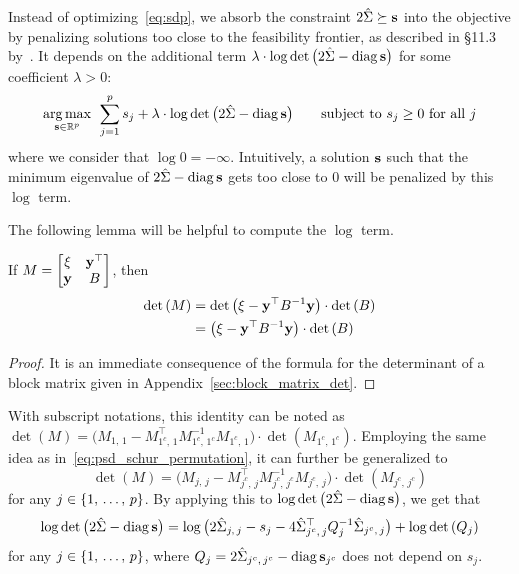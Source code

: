 Instead of optimizing~\ref{eq:sdp},
we absorb the constraint $2\hat{\Sigma} \succeq \mathbf{s}$ into the objective by penalizing solutions
too close to the feasibility frontier, as described in §11.3 by~\cite{convex_optimization}.
It depends on the additional term
$\lambda \cdot \log\det\big( 2\hat{\Sigma} - \operatorname*{diag}\mathbf{s} \big)$
for some coefficient $\lambda > 0$:
\begin{equation}\label{eq:sdp_log_barrier}
    \underset{\mathbf{s} \in \mathbb{R}^p}{\operatorname*{arg\,max}}\;\,
    \sum_{j = 1}^p s_j
    + \lambda \cdot \log\det\big( 2\hat{\Sigma} - \operatorname*{diag}\mathbf{s} \big)
    \qquad
    \text{subject to }
    s_j \geq 0\text{ for all } j
\end{equation}
where we consider that $\log 0 = -\infty$.
Intuitively, a solution $\mathbf{s}$ such that the minimum eigenvalue of $2\hat{\Sigma} - \operatorname*{diag}\mathbf{s}$ gets too close to $0$
will be penalized by this $\log$ term.

\bigbreak
The following lemma will be helpful to compute the $\log$ term.
\begin{lemma}
    If $M = \begin{bmatrix}
        \xi & \mathbf{y}^\top\\
        \mathbf{y} & B
    \end{bmatrix}$,
    then
    \begin{align*}
        \det\left( M \right) &= \det\big( \xi - \mathbf{y}^\top B^{-1} \mathbf{y} \big) \cdot \det\left( B \right)\\
        &= \big( \xi - \mathbf{y}^\top B^{-1} \mathbf{y} \big) \cdot \det\left( B \right)
    \end{align*}
\end{lemma}
\begin{proof}
    It is an immediate consequence of the formula for the determinant of a block matrix
    given in Appendix~\ref{sec:block_matrix_det}.
\end{proof}
With subscript notations, this identity can be noted as
$\det\left( M \right) = \big( M_{1,\, 1} - M_{1^c,\, 1}^\top M_{1^c,\, 1^c}^{-1} M_{1^c,\, 1} \big)
    \cdot\det\left( M_{1^c,\, 1^c} \right)$.
Employing the same idea as in~\ref{eq:psd_schur_permutation},
it can further be generalized to
\begin{equation*}
    \det\left( M \right) = \big( M_{j,\, j} - M_{j^c,\, j}^\top M_{j^c,\, j^c}^{-1} M_{j^c,\, j} \big)
        \cdot\det\left( M_{j^c,\, j^c} \right)
\end{equation*}
for any $j \in \left\{ 1,\, \dots,\, p \right\}$.
By applying this to $\log\det\big( 2\hat{\Sigma} - \operatorname*{diag}\mathbf{s} \big)$,
we get that
\begin{equation*}
    \log\det\big( 2\hat{\Sigma} - \operatorname*{diag}\mathbf{s} \big) =
        \log\big( 2\hat{\Sigma}_{j,\, j} - s_j - 4\hat{\Sigma}_{j^c,\, j}^\top Q_j^{-1} \hat{\Sigma}_{j^c,\, j} \big)
            + \log\det\left( Q_j \right)
\end{equation*}
for any $j \in \left\{ 1,\, \dots,\, p \right\}$,
where $Q_j = 2\hat{\Sigma}_{j^c,\, j^c} - \operatorname*{diag}\mathbf{s}_{j^c}$ does not depend on $s_j$.

